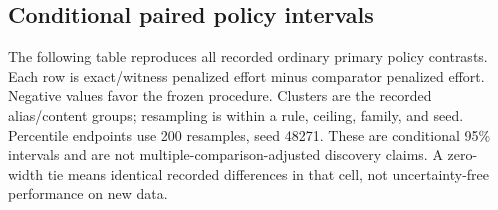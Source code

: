 \documentclass{article}
\begin{document}
\subsection{Conditional paired policy intervals}
The following table reproduces all recorded ordinary primary policy contrasts. Each row is exact/witness penalized effort minus comparator penalized effort. Negative values favor the frozen procedure. Clusters are the recorded alias/content groups; resampling is within a rule, ceiling, family, and seed. Percentile endpoints use 200 resamples, seed 48271. These are conditional 95\% intervals and are not multiple-comparison-adjusted discovery claims. A zero-width tie means identical recorded differences in that cell, not uncertainty-free performance on new data.
\end{document}
